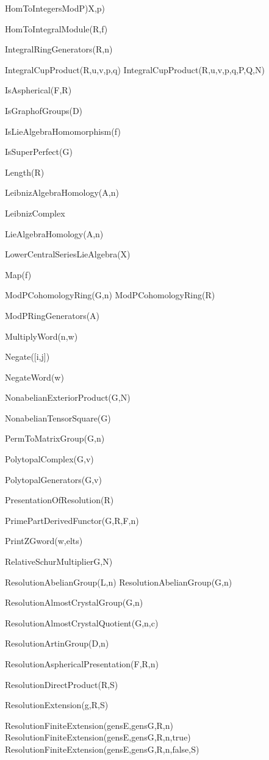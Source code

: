 \>HomToIntegersModP)X,p)

\>HomToIntegralModule(R,f)

\>IntegralRingGenerators(R,n)

\>IntegralCupProduct(R,u,v,p,q)
\>IntegralCupProduct(R,u,v,p,q,P,Q,N)

\>IsAspherical(F,R)

\>IsGraphofGroups(D)

\>IsLieAlgebraHomomorphism(f)

\>IsSuperPerfect(G)

\>Length(R)

\>LeibnizAlgebraHomology(A,n)

\>LeibnizComplex

\>LieAlgebraHomology(A,n)

\>LowerCentralSeriesLieAlgebra(X)

\>Map(f)

\>ModPCohomologyRing(G,n)
\>ModPCohomologyRing(R)

\>ModPRingGenerators(A)

\>MultiplyWord(n,w)

\>Negate([i,j])

\>NegateWord(w)

\>NonabelianExteriorProduct(G,N)

\>NonabelianTensorSquare(G)

\>PermToMatrixGroup(G,n)

\>PolytopalComplex(G,v)

\>PolytopalGenerators(G,v)

\>PresentationOfResolution(R)

\>PrimePartDerivedFunctor(G,R,F,n)

\>PrintZGword(w,elts)

\>RelativeSchurMultiplierG,N)

\>ResolutionAbelianGroup(L,n)
\>ResolutionAbelianGroup(G,n)

\>ResolutionAlmostCrystalGroup(G,n)

\>ResolutionAlmostCrystalQuotient(G,n,c)

\>ResolutionArtinGroup(D,n)

\>ResolutionAsphericalPresentation(F,R,n)
	
\>ResolutionDirectProduct(R,S)

\>ResolutionExtension(g,R,S)

\>ResolutionFiniteExtension(gensE,gensG,R,n)
\>ResolutionFiniteExtension(gensE,gensG,R,n,true)
\>ResolutionFiniteExtension(gensE,gensG,R,n,false,S)

